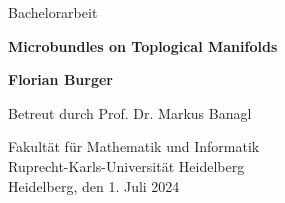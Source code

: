 \begin{titlepage}
    \begin{center}
        \vspace{1.5cm}
        
        \begin{Large}Bachelorarbeit\end{Large}
        
        \vspace*{1cm}

        \begin{LARGE}\textbf{Microbundles on Toplogical Manifolds}\end{LARGE}
             
        \vspace{1cm}
 
        \begin{large}\textbf{Florian Burger}\end{large}
 
        \vfill
             
        \begin{large}
            Betreut durch Prof. Dr. Markus Banagl                
            
            \vspace{0.5cm}

            Fakultät für Mathematik und Informatik\\
            Ruprecht-Karls-Universität Heidelberg\\
            Heidelberg, den 1. Juli 2024
        \end{large}
    \end{center}
 \end{titlepage}